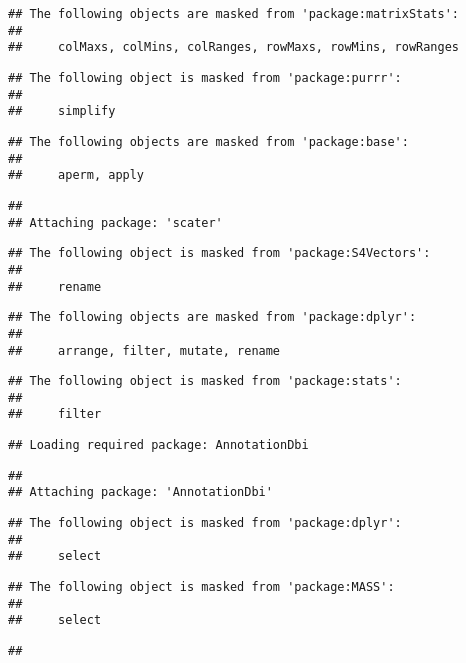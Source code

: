\documentclass[]{article}
\begin{document}
\begin{verbatim}
## The following objects are masked from 'package:matrixStats':
## 
##     colMaxs, colMins, colRanges, rowMaxs, rowMins, rowRanges
\end{verbatim}

\begin{verbatim}
## The following object is masked from 'package:purrr':
## 
##     simplify
\end{verbatim}

\begin{verbatim}
## The following objects are masked from 'package:base':
## 
##     aperm, apply
\end{verbatim}

\begin{verbatim}
## 
## Attaching package: 'scater'
\end{verbatim}

\begin{verbatim}
## The following object is masked from 'package:S4Vectors':
## 
##     rename
\end{verbatim}

\begin{verbatim}
## The following objects are masked from 'package:dplyr':
## 
##     arrange, filter, mutate, rename
\end{verbatim}

\begin{verbatim}
## The following object is masked from 'package:stats':
## 
##     filter
\end{verbatim}

\begin{verbatim}
## Loading required package: AnnotationDbi
\end{verbatim}

\begin{verbatim}
## 
## Attaching package: 'AnnotationDbi'
\end{verbatim}

\begin{verbatim}
## The following object is masked from 'package:dplyr':
## 
##     select
\end{verbatim}

\begin{verbatim}
## The following object is masked from 'package:MASS':
## 
##     select
\end{verbatim}

\begin{verbatim}
## 
\end{verbatim}
\end{document}
